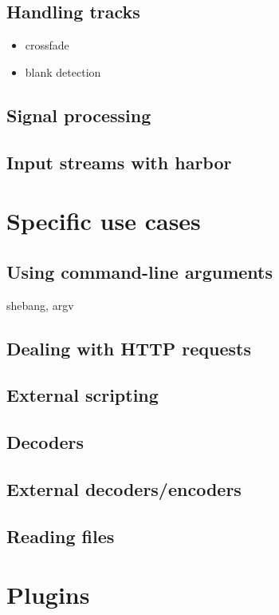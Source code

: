 \documentclass{book}
\begin{document}
\section{Handling tracks}
\begin{itemize}
\item crossfade
\item blank detection
\end{itemize}

\section{Signal processing}

\section{Input streams with harbor}

\chapter{Specific use cases}
\section{Using command-line arguments}
shebang, argv

\section{Dealing with HTTP requests}

\section{External scripting}

\section{Decoders}

\section{External decoders/encoders}

\section{Reading files}

\chapter{Plugins}
\end{document}

